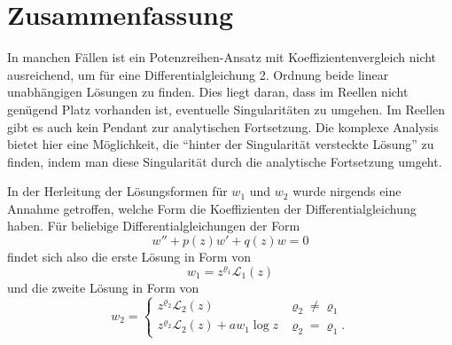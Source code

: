 \section{Zusammenfassung}
In manchen Fällen ist ein Potenzreihen-Ansatz mit Koeffizientenvergleich nicht ausreichend, um für eine Differentialgleichung 2. Ordnung beide linear unabhängigen Lösungen zu finden. 
Dies liegt daran, dass im Reellen nicht genügend Platz vorhanden ist, eventuelle Singularitäten zu umgehen. 
Im Reellen gibt es auch kein Pendant zur analytischen Fortsetzung. 
Die komplexe Analysis bietet hier eine Möglichkeit, die ``hinter der Singularität versteckte Lösung'' zu finden, indem man diese Singularität durch die analytische Fortsetzung umgeht. 

In der Herleitung der Lösungsformen für $w_1$ und $w_2$ wurde nirgends eine Annahme getroffen, welche Form die Koeffizienten der Differentialgleichung haben. 
Für beliebige Differentialgleichungen der Form
\[w'' + p(z)w' + q(z)w=0\]
findet sich also die erste Lösung in Form von
\[ w_1 = z^{\varrho_1}\mathcal{L}_1(z)\]
und die zweite Lösung in Form von
\[w_2 = \begin{cases}
z^{\varrho_2}\mathcal{L}_2(z) & \varrho_2\ne\varrho_1 \\
z^{\varrho_2}\mathcal{L}_2(z) + a w_1 \log z & \varrho_2=\varrho_1.
\end{cases} \]
